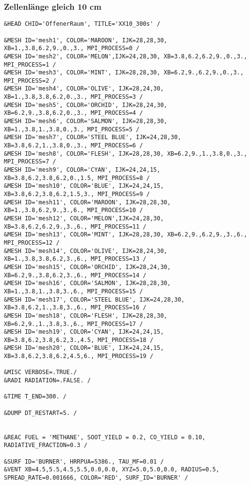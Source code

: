 \subsubsection{Zellenlänge gleich 10 cm}
\begin{lstlisting}[emptylines=0,basicstyle=\tiny]
&HEAD CHID='OffenerRaum', TITLE='XX10_300s' /

&MESH ID='mesh1', COLOR='MAROON', IJK=28,28,30, XB=1.,3.8,6.2,9.,0.,3., MPI_PROCESS=0 /
&MESH ID='mesh2', COLOR='MELON',IJK=24,28,30, XB=3.8,6.2,6.2,9.,0.,3., MPI_PROCESS=1 /
&MESH ID='mesh3', COLOR='MINT', IJK=28,28,30, XB=6.2,9.,6.2,9.,0.,3., MPI_PROCESS=2 /
&MESH ID='mesh4', COLOR='OLIVE', IJK=28,24,30, XB=1.,3.8,3.8,6.2,0.,3., MPI_PROCESS=3 /
&MESH ID='mesh5', COLOR='ORCHID', IJK=28,24,30, XB=6.2,9.,3.8,6.2,0.,3., MPI_PROCESS=4 /
&MESH ID='mesh6', COLOR='SALMON', IJK=28,28,30, XB=1.,3.8,1.,3.8,0.,3., MPI_PROCESS=5 /
&MESH ID='mesh7', COLOR='STEEL BLUE', IJK=24,28,30, XB=3.8,6.2,1.,3.8,0.,3., MPI_PROCESS=6 /
&MESH ID='mesh8', COLOR='FLESH', IJK=28,28,30, XB=6.2,9.,1.,3.8,0.,3., MPI_PROCESS=7 /
&MESH ID='mesh9', COLOR='CYAN', IJK=24,24,15, XB=3.8,6.2,3.8,6.2,0.,1.5, MPI_PROCESS=8 /
&MESH ID='mesh10', COLOR='BLUE', IJK=24,24,15, XB=3.8,6.2,3.8,6.2,1.5,3., MPI_PROCESS=9 /
&MESH ID='mesh11', COLOR='MAROON', IJK=28,28,30, XB=1.,3.8,6.2,9.,3.,6., MPI_PROCESS=10 /
&MESH ID='mesh12', COLOR='MELON',IJK=24,28,30, XB=3.8,6.2,6.2,9.,3.,6., MPI_PROCESS=11 /
&MESH ID='mesh13', COLOR='MINT', IJK=28,28,30, XB=6.2,9.,6.2,9.,3.,6., MPI_PROCESS=12 /
&MESH ID='mesh14', COLOR='OLIVE', IJK=28,24,30, XB=1.,3.8,3.8,6.2,3.,6., MPI_PROCESS=13 /
&MESH ID='mesh15', COLOR='ORCHID', IJK=28,24,30, XB=6.2,9.,3.8,6.2,3.,6., MPI_PROCESS=14 /
&MESH ID='mesh16', COLOR='SALMON', IJK=28,28,30, XB=1.,3.8,1.,3.8,3.,6., MPI_PROCESS=15 /
&MESH ID='mesh17', COLOR='STEEL BLUE', IJK=24,28,30, XB=3.8,6.2,1.,3.8,3.,6., MPI_PROCESS=16 /
&MESH ID='mesh18', COLOR='FLESH', IJK=28,28,30, XB=6.2,9.,1.,3.8,3.,6., MPI_PROCESS=17 /
&MESH ID='mesh19', COLOR='CYAN', IJK=24,24,15, XB=3.8,6.2,3.8,6.2,3.,4.5, MPI_PROCESS=18 /
&MESH ID='mesh20', COLOR='BLUE', IJK=24,24,15, XB=3.8,6.2,3.8,6.2,4.5,6., MPI_PROCESS=19 /

&MISC VERBOSE=.TRUE./
&RADI RADIATION=.FALSE. /

&TIME T_END=300. /

&DUMP DT_RESTART=5. /


&REAC FUEL = 'METHANE', SOOT_YIELD = 0.2, CO_YIELD = 0.10, RADIATIVE_FRACTION=0.3 /

&SURF ID='BURNER', HRRPUA=5386., TAU_MF=0.01 /
&VENT XB=4.5,5.5,4.5,5.5,0.0,0.0, XYZ=5.0,5.0,0.0, RADIUS=0.5, SPREAD_RATE=0.001666, COLOR='RED', SURF_ID='BURNER' /




\end{lstlisting}
